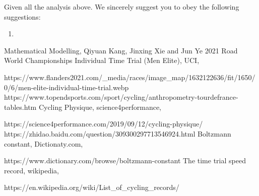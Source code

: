 \documentclass[12pt]{article}
\newcommand{\wholepages}{\pageref{LastPage}}
\newcommand{\itembf}{\item \textbf}
\theoremstyle{definition}
\theoremstyle{remark}
\numberwithin{equation}{section}
\begin{document}
	Given all the analysis above. We sincerely suggest you to obey the following suggestions:
	\begin{enumerate}

		\itembf{}
	\end{enumerate}
	\newpage
	\renewcommand\refname{References}
	\begin{thebibliography}{100}
		 Mathematical Modelling, Qiyuan Kang, Jinxing Xie and Jun Ye
		2021 Road World Championships Individual Time Trial (Men Elite), UCI,

		https://www.flanders2021.com/\_media/races/image\_map/1632122636/fit/1650/0/6/men-elite-individual-time-trial.webp
		https://www.topendsports.com/sport/cycling/anthropometry-tourdefrance-tables.htm
		Cycling Physique, science4performance,

		https://science4performance.com/2019/09/12/cycling-physique/
		https://zhidao.baidu.com/question/309300297713546924.html
		Boltzmann constant, Dictionaty.com,

		https://www.dictionary.com/browse/boltzmann-constant
		The time trial speed record, wikipedia,

		https://en.wikipedia.org/wiki/List\_of\_cycling\_records/
	\end{thebibliography}
\end{document}
